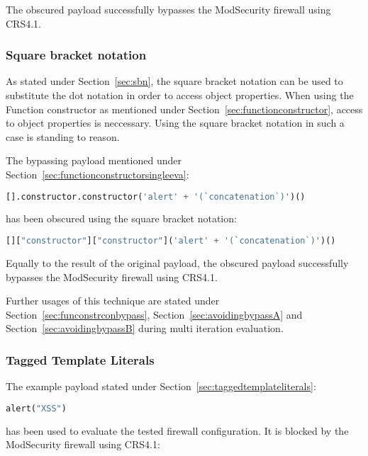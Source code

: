 The obscured payload successfully bypasses the ModSecurity firewall using CRS4.1.

\subsubsection{Square bracket notation}
As stated under Section~\ref{sec:sbn}, the square bracket notation can be used to substitute the dot notation in order to access object properties. When using the Function constructor as mentioned under Section~\ref{sec:functionconstructor}, access to object properties is neccessary. Using the square bracket notation in such a case is standing to reason.

The bypassing payload mentioned under Section~\ref{sec:functionconstructorsingleeva}:

\begin{lstlisting}[style=basicStyle, language=Python]
[].constructor.constructor('alert' + '(`concatenation`)')()
\end{lstlisting}

has been obscured using the square bracket notation:

\begin{lstlisting}[style=basicStyle, language=Python, caption=square bracket notation bypass]
[]["constructor"]["constructor"]('alert' + '(`concatenation`)')()
\end{lstlisting}

Equally to the result of the original payload, the obscured payload successfully bypasses the ModSecurity firewall using CRS4.1.

Further usages of this technique are stated under Section~\ref{sec:funconstrconbypass}, Section~\ref{sec:avoidingbypassA} and Section~\ref{sec:avoidingbypassB} during multi iteration evaluation.


\subsubsection{Tagged Template Literals}
\label{sec:taggedtemplateliteralsevaluation}
The example payload stated under Section~\ref{sec:taggedtemplateliterals}:

\begin{lstlisting}[style=basicStyle, language=Python]
alert("XSS")
\end{lstlisting}

has been used to evaluate the tested firewall configuration. It is blocked by the ModSecurity firewall using CRS4.1:

